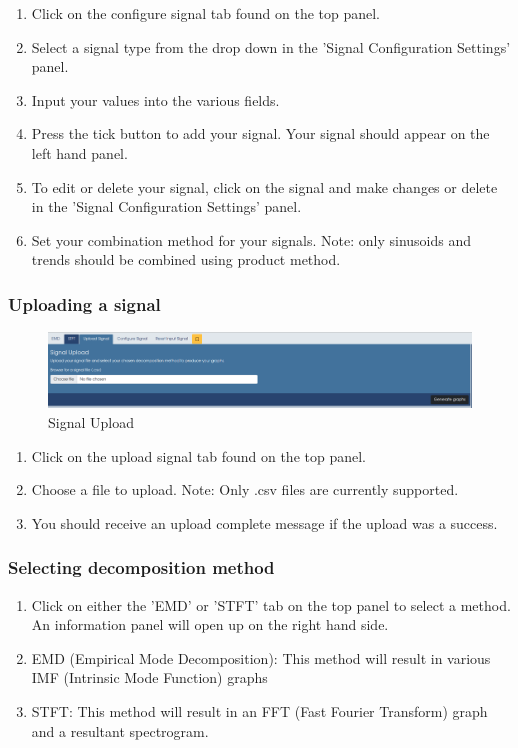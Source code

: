 \begin{enumerate}
\item Click on the configure signal tab found on the top panel.
\item Select a signal type from the drop down in the 'Signal Configuration Settings' panel.
\item Input your values into the various fields.
\item Press the tick button to add your signal. Your signal should appear on the left hand panel.
\item To edit or delete your signal, click on the signal and make changes or delete in the 'Signal Configuration Settings' panel.
\item Set your combination method for your signals. Note: only sinusoids and trends should be combined using product method.
\end{enumerate}

\subsubsection{Uploading a signal}
\begin{figure}[H]
\centering
\includegraphics[width=1.0\textwidth]{figures/signalupload.png}
\caption{\label{fig:Signal Upload}Signal Upload}
\end{figure}

\begin{enumerate}
\item Click on the upload signal tab found on the top panel.
\item Choose a file to upload. Note: Only .csv files are currently supported.
\item You should receive an upload complete message if the upload was a success.
\end{enumerate}

\subsubsection{Selecting decomposition method}
\begin{enumerate}
\item Click on either the 'EMD' or 'STFT' tab on the top panel to select a method. An information panel will open up on the right hand side.
\item EMD (Empirical Mode Decomposition): This method will result in various IMF (Intrinsic Mode Function) graphs %
\item STFT: This method will result in an FFT (Fast Fourier Transform) graph and a resultant spectrogram.
\end{enumerate}


